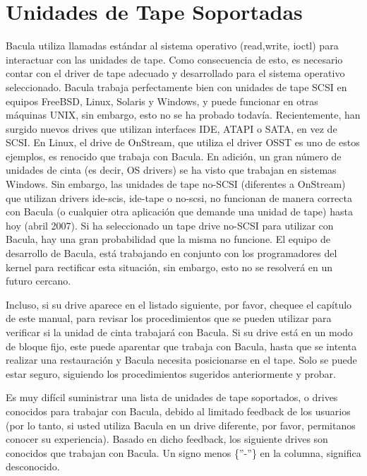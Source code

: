 
\chapter{Unidades de Tape Soportadas}
\label{DrivesSoportados}

Bacula utiliza llamadas estándar al sistema operativo (read,write, ioctl) para interactuar
con las unidades de tape. Como consecuencia de esto, es necesario contar con el driver
de tape adecuado y desarrollado para el sistema operativo seleccionado. Bacula trabaja
perfectamente bien con unidades de tape SCSI en equipos FreeBSD, Linux, Solaris y
Windows, y puede funcionar en otras máquinas UNIX, sin embargo, esto no se ha probado
todavía. Recientemente, han surgido nuevos drives que utilizan interfaces IDE, ATAPI
o SATA, en vez de SCSI. En Linux, el drive de OnStream, que utiliza el driver OSST
es uno de estos ejemplos, es renocido que trabaja con Bacula. En adición, un gran
número de unidades de cinta (es decir, OS drivers) se ha visto que trabajan en sistemas
Windows. Sin embargo, las unidades de tape no-SCSI (diferentes a OnStream) que utilizan
drivers ide-scis, ide-tape o no-scsi, no funcionan de manera correcta con Bacula
(o cualquier otra aplicación que demande una unidad de tape) hasta hoy (abril 2007).
Si ha seleccionado un tape drive no-SCSI para utilizar con Bacula, hay una gran probabilidad
que la misma no funcione. El equipo de desarrollo de Bacula, está trabajando en conjunto
con los programadores del kernel para rectificar esta situación, sin embargo, esto
no se resolverá en un futuro cercano.

Incluso, si su drive aparece en el listado siguiente, por favor, chequee el capítulo
 de este manual, para revisar los procedimientos
que se pueden utilizar para verificar si la unidad de cinta trabajará con Bacula.
Si su drive está en un modo de bloque fijo, este puede aparentar que trabaja con
Bacula, hasta que se intenta realizar una restauración y Bacula necesita posicionarse
en el tape. Solo se puede estar seguro, siguiendo los procedimientos sugeridos anteriormente
y probar.

Es muy difícil suministrar una lista de unidades de tape soportados, o drives conocidos
para trabajar con Bacula, debido al limitado feedback de los usuarios (por lo tanto, si 
usted utiliza Bacula en un drive diferente, por favor, permitanos conocer su experiencia). 
Basado en dicho feedback, los siguiente drives son conocidos que trabajan con
Bacula. Un signo menos \{''-''\} en la columna, significa desconocido.

